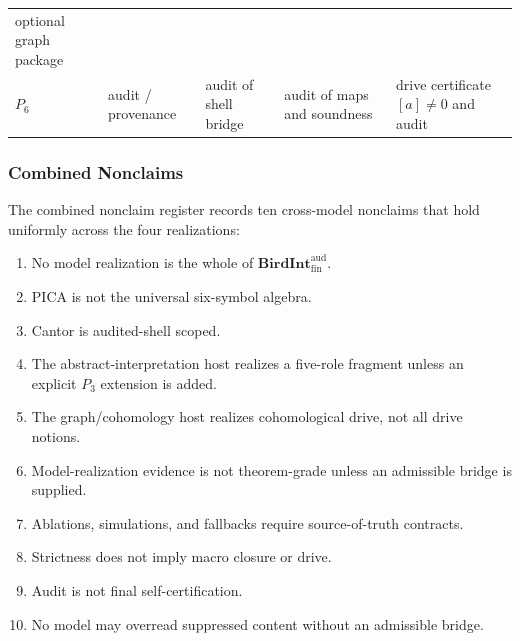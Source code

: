 \documentclass[11pt]{article}
\providecommand{\tightlist}{}
\theoremstyle{definition}
\begin{document}
\begin{longtable}[]{@{}lllll@{}}
\begin{minipage}[t]{0.19\columnwidth}
optional graph package\strut
\end{minipage}\tabularnewline
\begin{minipage}[t]{0.05\columnwidth}\raggedright
\(P_{6}\)\strut
\end{minipage} & \begin{minipage}[t]{0.18\columnwidth}\raggedright
audit / provenance\strut
\end{minipage} & \begin{minipage}[t]{0.20\columnwidth}\raggedright
audit of shell bridge\strut
\end{minipage} & \begin{minipage}[t]{0.25\columnwidth}\raggedright
audit of maps and soundness\strut
\end{minipage} & \begin{minipage}[t]{0.19\columnwidth}\raggedright
drive certificate \([a]\neq 0\) and audit\strut
\end{minipage}\tabularnewline
\bottomrule
\end{longtable}

\subsubsection{Combined Nonclaims}

The combined nonclaim register records ten cross-model nonclaims that hold uniformly across the four realizations:

\begin{enumerate}
\def\labelenumi{\arabic{enumi}.}
\tightlist
\item
  No model realization is the whole of \(\mathbf{BirdInt}^{\mathrm{aud}}_{\mathrm{fin}}\).
\item
  PICA is not the universal six-symbol algebra.
\item
  Cantor is audited-shell scoped.
\item
  The abstract-interpretation host realizes a five-role fragment unless an explicit \(P_{3}\) extension is added.
\item
  The graph/cohomology host realizes cohomological drive, not all drive notions.
\item
  Model-realization evidence is not theorem-grade unless an admissible bridge is supplied.
\item
  Ablations, simulations, and fallbacks require source-of-truth contracts.
\item
  Strictness does not imply macro closure or drive.
\item
  Audit is not final self-certification.
\item
  No model may overread suppressed content without an admissible bridge.
\end{enumerate}
\end{document}
